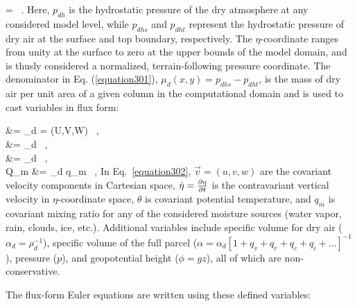 \be
\eta =  \mbox { .}
\label{equation301}
\ee
\noindent
 Here, $p_{dh}$ is the hydrostatic pressure of the dry atmosphere at any considered model level, while $p_{dhs}$ and $p_{dht}$ represent the hydrostatic pressure of dry air at the surface and top boundary, respectively. The $\eta$-coordinate ranges from unity at the surface to zero at the upper bounds of the model domain, and is thusly considered a normalized, terrain-following pressure coordinate. The denominator in Eq. (\autoref{equation301}), $\mu_d(x,y) = p_{dhs} - p_{dht}$, is the mass of dry air per unit area of a given column in the computational domain and is used to cast variables in flux form:

\bse \label{equation302}
\bal
{} &= \mu_d  = (U,V,W) \mbox{ ,} \label{equation302a} \\
\Omega &= \mu_d \dot{\eta} \mbox{ ,} \label{equation302b} \\
\Theta &= \mu_d \theta \mbox{ ,} \label{equation302c} \\
Q_m &= \mu_d q_m \mbox{ ,} \label{equation302d}
\eal
\ese
\noindent
 In Eq.~\eqref{equation302}, $\vec{v} = (u,v,w)$ are the covariant velocity components in Cartesian space, $\dot{\eta} = \frac{\partial\eta}{\partial t}$ is the contravariant vertical velocity in $\eta$-coordinate space, $\theta$ is covariant potential temperature, and $q_m$ is covariant mixing ratio for any of the considered moisture sources (water vapor, rain, clouds, ice, etc.). Additional variables include specific volume for dry air ($ \alpha_d = \rho_d^{-1}$), specific volume of the full parcel ($\alpha = \alpha_d[1 + q_v + q_r + q_c + q_i + \ldots]^{-1}$), pressure ($p$), and geopotential height ($\phi = gz$), all of which are non-conservative. 

The flux-form Euler equations are written using these defined variables:

